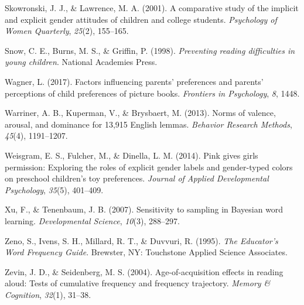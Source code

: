 \documentclass[english,,man,floatsintext]{apa6}
\begin{document}
\leavevmode\hypertarget{ref-skowronski2001comparative}{}%
Skowronski, J. J., \& Lawrence, M. A. (2001). A comparative study of the implicit and explicit gender attitudes of children and college students. \emph{Psychology of Women Quarterly}, \emph{25}(2), 155--165.

\leavevmode\hypertarget{ref-snow1998preventing}{}%
Snow, C. E., Burns, M. S., \& Griffin, P. (1998). \emph{Preventing reading difficulties in young children}. National Academies Press.

\leavevmode\hypertarget{ref-wagner2017factors}{}%
Wagner, L. (2017). Factors influencing parents' preferences and parents' perceptions of child preferences of picture books. \emph{Frontiers in Psychology}, \emph{8}, 1448.

\leavevmode\hypertarget{ref-warriner2013norms}{}%
Warriner, A. B., Kuperman, V., \& Brysbaert, M. (2013). Norms of valence, arousal, and dominance for 13,915 English lemmas. \emph{Behavior Research Methods}, \emph{45}(4), 1191--1207.

\leavevmode\hypertarget{ref-weisgram2014pink}{}%
Weisgram, E. S., Fulcher, M., \& Dinella, L. M. (2014). Pink gives girls permission: Exploring the roles of explicit gender labels and gender-typed colors on preschool children's toy preferences. \emph{Journal of Applied Developmental Psychology}, \emph{35}(5), 401--409.

\leavevmode\hypertarget{ref-xu2007b}{}%
Xu, F., \& Tenenbaum, J. B. (2007). Sensitivity to sampling in Bayesian word learning. \emph{Developmental Science}, \emph{10}(3), 288--297.

\leavevmode\hypertarget{ref-tasa_norms}{}%
Zeno, S., Ivens, S. H., Millard, R. T., \& Duvvuri, R. (1995). \emph{The Educator's Word Frequency Guide}. Brewster, NY: Touchstone Applied Science Associates.

\leavevmode\hypertarget{ref-zevin2004age}{}%
Zevin, J. D., \& Seidenberg, M. S. (2004). Age-of-acquisition effects in reading aloud: Tests of cumulative frequency and frequency trajectory. \emph{Memory \& Cognition}, \emph{32}(1), 31--38.
\end{document}
